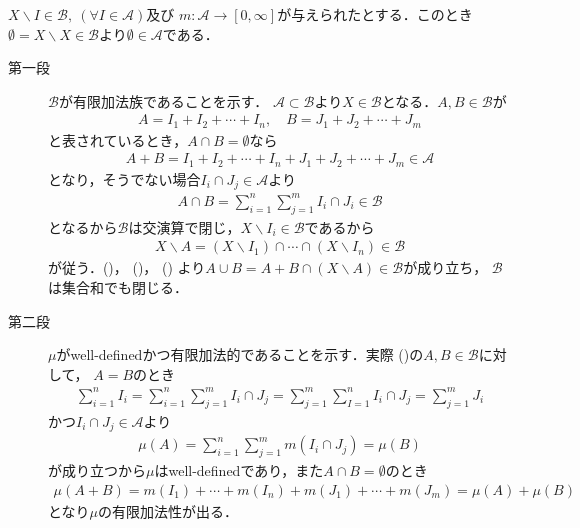 		\begin{prf} $X \backslash I \in \mathcal{B},\ (\forall I \in \mathcal{A})$及び
			$m:\mathcal{A} \longrightarrow [0,\infty]$が与えられたとする．このとき
			$\emptyset = X \backslash X \in \mathcal{B}$より$\emptyset \in \mathcal{A}$である．
			\begin{description}
				\item[第一段]
					$\mathcal{B}$が有限加法族であることを示す．
					$\mathcal{A} \subset \mathcal{B}$より$X \in \mathcal{B}$となる．$A,B \in \mathcal{B}$が
					\begin{align}
						A = I_1 + I_2 + \cdots + I_n,
						\quad B = J_1 + J_2 + \cdots + J_m
						\label{eq:thm_forming_finitely_additive_class_4}
					\end{align}
					と表されているとき，$A \cap B = \emptyset$なら
					\begin{align}
						A + B = I_1 + I_2 + \cdots + I_n + J_1 + J_2 + \cdots + J_m \in \mathcal{A}
						\label{eq:thm_forming_finitely_additive_class_1}
					\end{align}
					となり，そうでない場合$I_i \cap J_j \in \mathcal{A}$より
					\begin{align}
						A \cap B = \sum_{i=1}^n\sum_{j=1}^m I_i \cap J_i \in \mathcal{B}
						\label{eq:thm_forming_finitely_additive_class_2}
					\end{align}
					となるから$\mathcal{B}$は交演算で閉じ，$X \backslash I_i \in \mathcal{B}$であるから
					\begin{align}
						X \backslash A = (X \backslash I_1) \cap \cdots \cap (X \backslash I_n) \in \mathcal{B}
						\label{eq:thm_forming_finitely_additive_class_3}
					\end{align}
					が従う．()，
					()，
					()
					より$A \cup B = A + B \cap (X \backslash A) \in \mathcal{B}$が成り立ち，
					$\mathcal{B}$は集合和でも閉じる．
		
				\item[第二段]
					$\mu$がwell-definedかつ有限加法的であることを示す．実際
					()の$A,B \in \mathcal{B}$に対して，
					$A = B$のとき
					\begin{align}
						\sum_{i=1}^n I_i = \sum_{i=1}^n \sum_{j=1}^m I_i \cap J_j 
						= \sum_{j=1}^m \sum_{I=1}^n I_i \cap J_j = \sum_{j=1}^m J_i
					\end{align}
					かつ$I_i \cap J_j \in \mathcal{A}$より
					\begin{align}
						\mu(A) = \sum_{i=1}^n \sum_{j=1}^m m(I_i \cap J_j) = \mu(B)
					\end{align}
					が成り立つから$\mu$はwell-definedであり，また$A \cap B = \emptyset$のとき
					\begin{align}
						\mu(A + B)
						=  m(I_1) + \cdots + m(I_n) + m(J_1) + \cdots + m(J_m)
						= \mu(A) + \mu(B)
					\end{align}
					となり$\mu$の有限加法性が出る．
					\QED
			\end{description}
		\end{prf}
		
